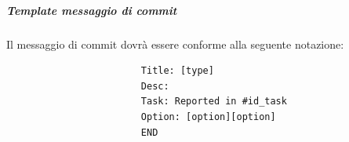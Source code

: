 				\subparagraph{Template messaggio di commit}
				\label{sec:messaggio_di_commit}
				Il messaggio di commit dovrà essere conforme alla seguente notazione:
					\begin{verbatim}
						Title: [type]
						Desc:
						Task: Reported in #id_task
						Option: [option][option]
						END
					\end{verbatim}
				

